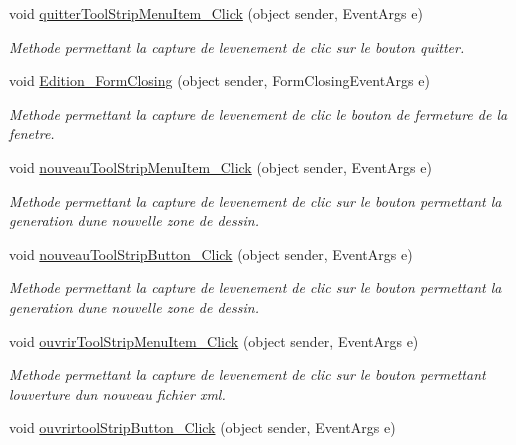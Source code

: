 \begin{DoxyCompactItemize}
void \hyperlink{group__inf2990_gaf26e9a1228f2564ca282c82784afc0f2}{quitter\+Tool\+Strip\+Menu\+Item\+\_\+\+Click} (object sender, Event\+Args e)
\begin{DoxyCompactList}\small\item\em Methode permettant la capture de l\textquotesingle{}evenement de clic sur le bouton quitter. \end{DoxyCompactList}\item 
void \hyperlink{group__inf2990_gac7569ece4c54805bc43c117ec0983fd0}{Edition\+\_\+\+Form\+Closing} (object sender, Form\+Closing\+Event\+Args e)
\begin{DoxyCompactList}\small\item\em Methode permettant la capture de l\textquotesingle{}evenement de clic le bouton de fermeture de la fenetre. \end{DoxyCompactList}\item 
void \hyperlink{group__inf2990_ga54bd0e88a0a4b8efb44809f8237f4e7c}{nouveau\+Tool\+Strip\+Menu\+Item\+\_\+\+Click} (object sender, Event\+Args e)
\begin{DoxyCompactList}\small\item\em Methode permettant la capture de l\textquotesingle{}evenement de clic sur le bouton permettant la generation d\textquotesingle{}une nouvelle zone de dessin. \end{DoxyCompactList}\item 
void \hyperlink{group__inf2990_ga59ab92f2af65a634b45c9edad6ddf3d3}{nouveau\+Tool\+Strip\+Button\+\_\+\+Click} (object sender, Event\+Args e)
\begin{DoxyCompactList}\small\item\em Methode permettant la capture de l\textquotesingle{}evenement de clic sur le bouton permettant la generation d\textquotesingle{}une nouvelle zone de dessin. \end{DoxyCompactList}\item 
void \hyperlink{group__inf2990_ga6ac9caedab0ad5ad68d6118ea10e2f75}{ouvrir\+Tool\+Strip\+Menu\+Item\+\_\+\+Click} (object sender, Event\+Args e)
\begin{DoxyCompactList}\small\item\em Methode permettant la capture de l\textquotesingle{}evenement de clic sur le bouton permettant l\textquotesingle{}ouverture d\textquotesingle{}un nouveau fichier xml. \end{DoxyCompactList}\item 
void \hyperlink{group__inf2990_gadfd90b070545e720a233498ac0926b73}{ouvrirtool\+Strip\+Button\+\_\+\+Click} (object sender, Event\+Args e)

\end{DoxyCompactItemize}
